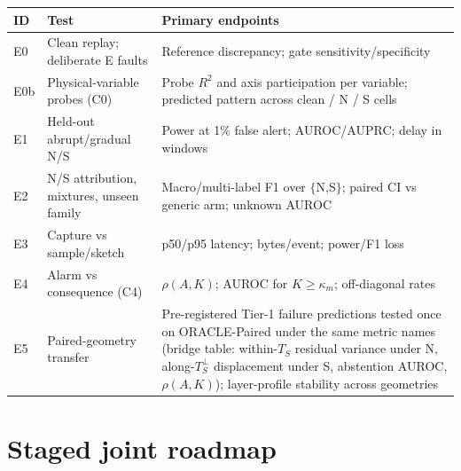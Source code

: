 \documentclass[10pt,twocolumn]{extarticle}
\begin{document}
\begin{center}
\scriptsize
{}
\begin{tabularx}{\columnwidth}{@{}p{0.16in}p{0.95in}Y@{}}
\toprule
ID & Test & Primary endpoints \\
\midrule
E0 & Clean replay; deliberate E faults & Reference discrepancy; gate
sensitivity/specificity \\
E0b & Physical-variable probes (C0) & Probe $R^2$ and axis participation per
variable; predicted pattern across clean / N / S cells \\
E1 & Held-out abrupt/gradual N/S & Power at 1\% false alert; AUROC/AUPRC;
delay in windows \\
E2 & N/S attribution, mixtures, unseen family & Macro/multi-label F1 over
$\{$N,S$\}$; paired CI vs generic arm; unknown AUROC \\
E3 & Capture vs sample/sketch & p50/p95 latency; bytes/event; power/F1 loss \\
E4 & Alarm vs consequence (C4) & $\rho(A,K)$; AUROC for $K\geq\kappa_m$;
off-diagonal rates \\
E5 & Paired-geometry transfer & Pre-registered Tier-1 failure predictions
tested once on ORACLE-Paired under the same metric names (bridge table:
within-$T_S$ residual variance under N, along-$T_S^{\perp}$ displacement under
S, abstention AUROC, $\rho(A,K)$); layer-profile stability across geometries \\
\bottomrule
\end{tabularx}
\label{tab:experiments}
\vspace{-0.5em}
\end{center}

\section{Staged joint roadmap}
\end{document}
